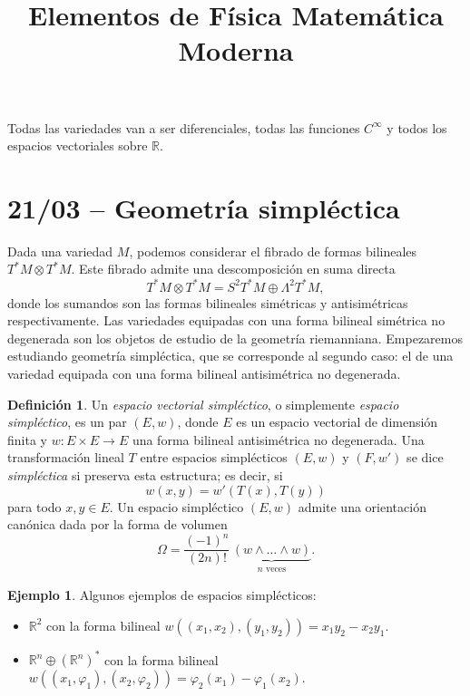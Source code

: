 \documentclass[11pt, a4paper]{article}
\title{Elementos de Física Matemática Moderna}
\date{}
\newcommand{\RR}{\mathbb{R}}
\newcommand{\cinf}{C^\infty}
\newcommand{\cotg}{T^*M}
\theoremstyle{plain}
\theoremstyle{definition}
\newtheorem{defn}[prop]{Definición}
\newtheorem{exmp}[prop]{Ejemplo}
\begin{document}
\maketitle{}

Todas las variedades van a ser diferenciales, todas las funciones $\cinf$ y todos los espacios vectoriales sobre $\RR$.
\section{21/03 -- Geometría simpléctica}
Dada una variedad $M$, podemos considerar el fibrado de formas bilineales $\cotg\otimes\cotg$. Este fibrado admite una descomposición en suma directa
\[\cotg\otimes\cotg = S^2\cotg \oplus \Lambda^2 \cotg,\]
donde los sumandos son las formas bilineales simétricas y antisimétricas respectivamente. Las variedades equipadas con una forma bilineal simétrica no degenerada son los objetos de estudio de la geometría riemanniana. Empezaremos estudiando geometría simpléctica, que se corresponde al segundo caso: el de una variedad equipada con una forma bilineal antisimétrica no degenerada.

\begin{defn} Un \emph{espacio vectorial simpléctico}, o simplemente \emph{espacio simpléctico}, es un par $(E,w)$, donde $E$ es un espacio vectorial de dimensión finita y $w:E\times E\to E$ una forma bilineal antisimétrica no degenerada. Una transformación lineal $T$ entre espacios simplécticos $(E,w)$ y $(F,w')$ se dice \emph{simpléctica} si preserva esta estructura; es decir, si
\[w(x,y)=w'\left(T(x), T(y)\right)\]
para todo $x,y\in E$. Un espacio simpléctico $(E,w)$ admite una orientación canónica dada por la forma de volumen
\[\Omega = \frac{(-1)^n}{(2n)!}\, \underbrace{(w\wedge\dots\wedge w)}_{\substack{\text{$n$ veces}}}.\]
\end{defn}

\begin{exmp} Algunos ejemplos de espacios simplécticos:
\begin{itemize}
\item $\RR^2$ con la forma bilineal $w\left((x_1,x_2), (y_1,y_2)\right)=x_1y_2 - x_2y_1$.
\item $\RR^n\oplus (\RR^n)^*$ con la forma bilineal $w\left((x_1,\varphi_1),(x_2,\varphi_2)\right) = \varphi_2(x_1)-\varphi_1(x_2)$.
\end{itemize}
\end{exmp}
\end{document}
